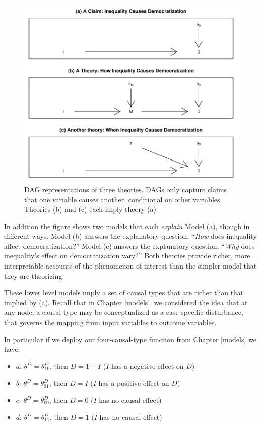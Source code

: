 \documentclass[12pt,]{book}
\providecommand{\tightlist}{%
  \setlength{\itemsep}{0pt}\setlength{\parskip}{0pt}}
\begin{document}
\begin{figure}

{\centering \includegraphics[width=.5\textwidth]{ii_files/figure-latex/demtheory5-1} 

}

\caption{DAG representations of three theories. DAGs only capture claims that one variable causes another, conditional on other variables. Theories (b) and (c) each imply theory (a).}\label{fig:demtheory5}
\end{figure}

In addition the figure shows two models that each \emph{explain} Model (a), though in different ways. Model (b) answers the explanatory question, ``\emph{How} does inequality affect democratization?'' Model (c) answers the explanatory question, ``\emph{Why} does inequality's effect on democratization vary?'' Both theories provide richer, more interpretable accounts of the phenomenon of interest than the simpler model that they are theorizing.

These lower level models imply a set of causal types that are richer than that implied by (a). Recall that in Chapter \ref{models}, we considered the idea that at any node, a causal type may be conceptualized as a case specific disturbance, that governs the mapping from input variables to outcome variables.

In particular if we deploy our four-causal-type function from Chapter \ref{models} we have:

\begin{itemize}
\tightlist
\item
  \(a\): \(\theta^D=\theta^D_{10}\), then \(D=1-I\) (\(I\) has a negative effect on \(D\))
\item
  \(b\): \(\theta^D=\theta^D_{01}\), then \(D=I\) (\(I\) has a positive effect on \(D\))
\item
  \(c\): \(\theta^D=\theta^D_{00}\), then \(D=0\) (\(I\) has no causal effect)
\item
  \(d\): \(\theta^D=\theta^D_{11}\), then \(D=1\) (\(I\) has no causal effect)
\end{itemize}
\end{document}
